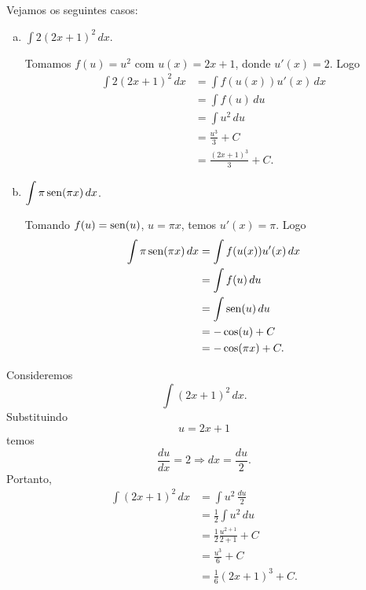 \begin{ex}
  Vejamos os seguintes casos:
  \begin{enumerate}[a)]
  \item $\displaystyle\int 2(2x+1)^2\,dx$.
    
    Tomamos $f(u) = u^2$ com $u(x) = 2x+1$, donde $u'(x) = 2$. Logo
    \begin{align}
      \int 2(2x+1)^2\,dx &= \int f(u(x))u'(x)\,dx \\
                         &= \int f(u)\,du \\
                         &= \int u^2\,du \\
                         &= \frac{u^3}{3} + C \\
                         &= \frac{(2x+1)^3}{3} + C.
    \end{align}
  \item $\displaystyle\int \pi\operatorname{sen}(\pi x)\,dx$.
    
    Tomando $f(u)=\operatorname{sen}(u)$, $u=\pi x$, temos $u'(x)=\pi$. Logo
    \begin{align}
      \int \pi\operatorname{sen}(\pi x)\,dx &= \int f(u(x))u'(x)\,dx \\
                              &= \int f(u)\,du \\
                              &= \int \operatorname{sen}(u)\,du \\
                              &= -\cos(u) + C \\
                              &= -\cos(\pi x) + C.
    \end{align}
  \end{enumerate}
\end{ex}

\begin{ex}
  Consideremos
  \begin{equation}
    \int (2x+1)^2\,dx.
  \end{equation}
  Substituindo
  \begin{equation}
    u = 2x+1
  \end{equation}
  temos
  \begin{equation}
    \frac{du}{dx} = 2 \Rightarrow dx = \frac{du}{2}.
  \end{equation}
  Portanto,
  \begin{align}
    \int (2x+1)^2\,dx &= \int u^2\,\frac{du}{2}\\
                     &= \frac{1}{2}\int u^2\,du\\
                     &= \frac{1}{2}\frac{u^{2+1}}{2+1} + C\\
                     &= \frac{u^3}{6} + C\\
                     &= \frac{1}{6}(2x+1)^3 + C.
  \end{align}
\end{ex}



